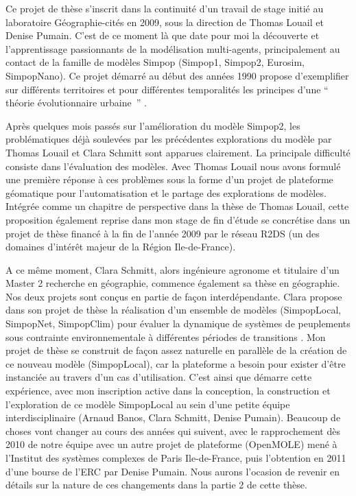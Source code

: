 Ce projet de thèse s'inscrit dans la continuité d'un travail de stage initié au laboratoire Géographie-cités en 2009, sous la direction de Thomas Louail et Denise Pumain. C'est de ce moment là que date pour moi  la découverte et l'apprentissage passionnants de la modélisation multi-agents, principalement au contact de la famille de modèles Simpop (Simpop1, Simpop2, Eurosim, SimpopNano). Ce projet démarré au début des années 1990 propose d'exemplifier sur différents territoires et pour différentes temporalités les principes d'une \enquote{ théorie évolutionnaire urbaine } \autocite{Pumain1997}.⁠⁠ 

Après quelques mois passés sur l'amélioration du modèle Simpop2, les problématiques déjà soulevées par les précédentes explorations du modèle par Thomas Louail et Clara Schmitt sont apparues clairement. La principale difficulté consiste dans l’évaluation des modèles. Avec Thomas Louail nous avons formulé une première réponse à ces problèmes sous la forme  d'un projet de plateforme géomatique pour l'automatisation et le partage des explorations de modèles. Intégrée comme un chapitre de perspective dans la thèse de Thomas Louail, cette proposition également reprise dans mon stage de fin d'étude se concrétise dans un projet de thèse financé à la fin de l'année 2009 \autocite{Rey2009} par le réseau R2DS (un des domaines d’intérêt majeur de la Région Ile-de-France).

A ce même moment, Clara Schmitt, alors ingénieure agronome et titulaire d'un Master 2 recherche en géographie, commence également sa thèse en géographie. Nos deux projets sont conçus en partie de façon interdépendante. Clara propose dans son projet de thèse la réalisation d'un ensemble de modèles (SimpopLocal, SimpopNet, SimpopClim) pour évaluer la dynamique de systèmes de peuplements sous contrainte environnementale à différentes périodes de transitions \autocite{Schmitt2014}⁠. ⁠Mon projet de thèse se construit de façon assez naturelle en parallèle de la création de ce nouveau modèle (SimpopLocal), car la plateforme a besoin pour exister d'être instanciée au travers d'un cas d'utilisation. C'est ainsi que démarre cette expérience, avec mon inscription active dans la conception, la construction et l'exploration de ce modèle SimpopLocal au sein d'une petite équipe interdisciplinaire (Arnaud Banos, Clara Schmitt, Denise Pumain). Beaucoup de choses vont changer au cours des années qui suivent, avec le rapprochement dès 2010 de notre équipe avec un autre projet de plateforme (OpenMOLE) mené à l'Institut des systèmes complexes de Paris Ile-de-France, puis l'obtention en 2011 d'une bourse de l’ERC par Denise Pumain. Nous aurons l'ocasion de revenir en détails sur la nature de ces changements dans la partie 2 de cette thèse.

